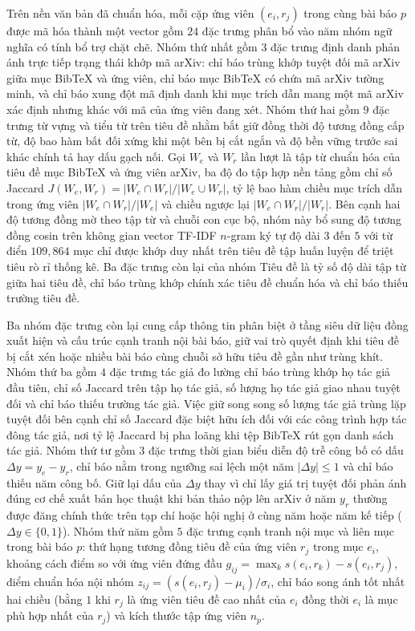 Trên nền văn bản đã chuẩn hóa, mỗi cặp ứng viên $(e_i, r_j)$ trong cùng bài báo $p$ được mã hóa thành một vector gồm $24$ đặc trưng phân bổ vào năm nhóm ngữ nghĩa có tính bổ trợ chặt chẽ. Nhóm thứ nhất gồm $3$ đặc trưng định danh phản ánh trực tiếp trạng thái khớp mã arXiv: chỉ báo trùng khớp tuyệt đối mã arXiv giữa mục BibTeX và ứng viên, chỉ báo mục BibTeX có chứa mã arXiv tường minh, và chỉ báo xung đột mã định danh khi mục trích dẫn mang một mã arXiv xác định nhưng khác với mã của ứng viên đang xét. Nhóm thứ hai gồm $9$ đặc trưng từ vựng và tiểu từ trên tiêu đề nhằm bắt giữ đồng thời độ tương đồng cấp từ, độ bao hàm bất đối xứng khi một bên bị cắt ngắn và độ bền vững trước sai khác chính tả hay dấu gạch nối. Gọi $W_e$ và $W_r$ lần lượt là tập từ chuẩn hóa của tiêu đề mục BibTeX và ứng viên arXiv, ba độ đo tập hợp nền tảng gồm chỉ số Jaccard $J(W_e, W_r) = |W_e \cap W_r| / |W_e \cup W_r|$, tỷ lệ bao hàm chiều mục trích dẫn trong ứng viên $|W_e \cap W_r| / |W_e|$ và chiều ngược lại $|W_e \cap W_r| / |W_r|$. Bên cạnh hai độ tương đồng mờ theo tập từ và chuỗi con cục bộ, nhóm này bổ sung độ tương đồng cosin trên không gian vector TF-IDF $n$-gram ký tự độ dài $3$ đến $5$ với từ điển $109{,}864$ mục chỉ được khớp duy nhất trên tiêu đề tập huấn luyện để triệt tiêu rò rỉ thống kê. Ba đặc trưng còn lại của nhóm Tiêu đề là tỷ số độ dài tập từ giữa hai tiêu đề, chỉ báo trùng khớp chính xác tiêu đề chuẩn hóa và chỉ báo thiếu trường tiêu đề.

Ba nhóm đặc trưng còn lại cung cấp thông tin phân biệt ở tầng siêu dữ liệu đồng xuất hiện và cấu trúc cạnh tranh nội bài báo, giữ vai trò quyết định khi tiêu đề bị cắt xén hoặc nhiều bài báo cùng chuỗi sở hữu tiêu đề gần như trùng khít. Nhóm thứ ba gồm $4$ đặc trưng tác giả đo lường chỉ báo trùng khớp họ tác giả đầu tiên, chỉ số Jaccard trên tập họ tác giả, số lượng họ tác giả giao nhau tuyệt đối và chỉ báo thiếu trường tác giả. Việc giữ song song số lượng tác giả trùng lặp tuyệt đối bên cạnh chỉ số Jaccard đặc biệt hữu ích đối với các công trình hợp tác đông tác giả, nơi tỷ lệ Jaccard bị pha loãng khi tệp BibTeX rút gọn danh sách tác giả. Nhóm thứ tư gồm $3$ đặc trưng thời gian biểu diễn độ trễ công bố có dấu $\Delta y = y_e - y_r$, chỉ báo nằm trong ngưỡng sai lệch một năm $|\Delta y| \le 1$ và chỉ báo thiếu năm công bố. Giữ lại dấu của $\Delta y$ thay vì chỉ lấy giá trị tuyệt đối phản ánh đúng cơ chế xuất bản học thuật khi bản thảo nộp lên arXiv ở năm $y_r$ thường được đăng chính thức trên tạp chí hoặc hội nghị ở cùng năm hoặc năm kế tiếp ($\Delta y \in \{0, 1\}$). Nhóm thứ năm gồm $5$ đặc trưng cạnh tranh nội mục và liên mục trong bài báo $p$: thứ hạng tương đồng tiêu đề của ứng viên $r_j$ trong mục $e_i$, khoảng cách điểm so với ứng viên đứng đầu $g_{ij} = \max_{k} s(e_i, r_k) - s(e_i, r_j)$, điểm chuẩn hóa nội nhóm $z_{ij} = (s(e_i, r_j) - \mu_i) / \sigma_i$, chỉ báo song ánh tốt nhất hai chiều (bằng $1$ khi $r_j$ là ứng viên tiêu đề cao nhất của $e_i$ đồng thời $e_i$ là mục phù hợp nhất của $r_j$) và kích thước tập ứng viên $n_p$.


